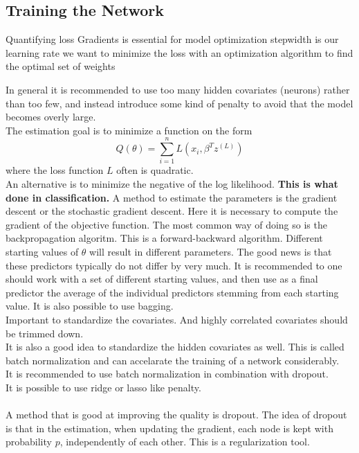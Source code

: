 




\subsection{Training the Network}
Quantifying loss
Gradients is essential for model optimization
stepwidth is our learning rate
we want to minimize the loss with an optimization algorithm to find the optimal set of weights

In general it is recommended to use too many hidden covariates (neurons) rather than too few, and instead introduce some kind of penalty to avoid that the model becomes overly large.
\\
The estimation goal is to minimize a function on the form
$$Q(\theta) = \sum_{i=1}^n L(x_i, \beta^T z^{(L)})$$
where the loss function $L$ often is quadratic.\\
An alternative is to minimize the negative of the log likelihood. \textbf{This is what done in classification.}
A method to estimate the parameters is the gradient descent or the stochastic gradient descent. Here it is necessary to compute the gradient of the objective function. The most common way of doing so is the backpropagation algoritm. This is a forward-backward algorithm. Different starting values of $\theta$ will result in different parameters. The good news is that these predictors typically do not differ by very much. It is recommended to one should work with a set of different starting values, and then use as a final predictor the average of the individual predictors stemming from each starting value. It is also possible to use bagging.
\\
Important to standardize the covariates. And highly correlated covariates should be trimmed down.\\
It is also a good idea to standardize the hidden covariates as well. This is called batch normalization and can accelarate the training of a network considerably.
\\
It is recommended to use batch normalization  in combination with dropout.
\\
It is possible to use ridge or lasso like penalty.
\\
\\
A method that is good at improving the quality is dropout. The idea of dropout is that in the estimation, when updating the gradient, each node is kept with probability $p$, independently of each other. This is a regularization tool.\\

